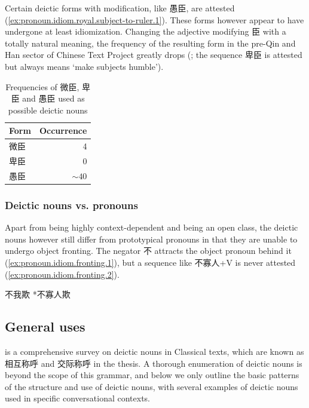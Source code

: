 \documentclass[UTF8, a4paper, oneside, scheme=plain, 12pt]{ctexrep}
\newcommand*{\citepages}[1]{pp.~{#1}}
\newcommand{\translate}[1]{`#1'}
\begin{document}
Certain deictic forms with modification, like 愚臣, are attested (\ref{ex:pronoun.idiom.royal.subject-to-ruler.1}).
These forms however appear to have undergone at least idiomization.
Changing the adjective modifying 臣 with a totally natural meaning,
the frequency of the resulting form in the pre-Qin and Han sector of Chinese Text Project greatly drops (; the sequence 卑臣 is attested but always means \translate{make subjects humble}).

\begin{table}[H]
    \caption{Frequencies of 微臣, 卑臣 and 愚臣 used as possible deictic nouns}
    \label{tbl:chen-frequency}
    \centering
    \begin{tabular}{lr}
        \toprule
        Form & Occurrence \\
        \midrule
        微臣 & 4 \\
        卑臣 & 0 \\
        愚臣 & $\sim 40$ \\
        \bottomrule
    \end{tabular}
\end{table}

\begin{exe}
    \ex 
\end{exe}

\subsubsection{Deictic nouns vs. pronouns}

Apart from being highly context-dependent and being an open class,
the deictic nouns however still differ from prototypical pronouns in that 
they are unable to undergo object fronting.
The negator 不 attracts the object pronoun behind it (\ref{ex:pronoun.idiom.fronting.1}),
but a sequence like 不寡人+V is never attested (\ref{ex:pronoun.idiom.fronting.2}).

\begin{exe}
    \ex\label{ex:pronoun.idiom.fronting.1} 不我欺
    \ex\label{ex:pronoun.idiom.fronting.2} *不寡人欺
\end{exe}


\subsection{General uses}

\citet[\citepages{125-140}]{wang2005names} is a comprehensive survey on deictic nouns in Classical texts,
which are known as 相互称呼 and 交际称呼 in the thesis.
A thorough enumeration of deictic nouns is beyond the scope of this grammar,
and below we only outline the basic patterns of the structure and use of deictic nouns,
with several examples of deictic nouns used in specific conversational contexts.
\end{document}
